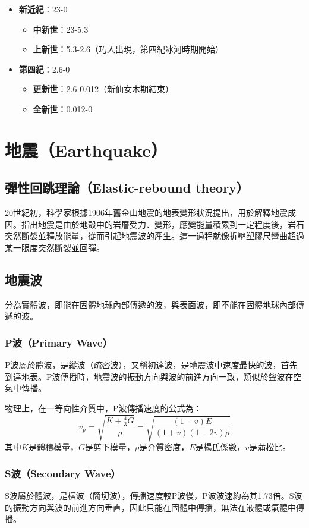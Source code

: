 \documentclass[a4paper,12pt]{report}
\begin{document}
\begin{itemize}
\begin{itemize}
\begin{itemize}
\item \textbf{新近紀}：23-0
\begin{itemize}
\item \textbf{中新世}：23-5.3
\item \textbf{上新世}：5.3-2.6（巧人出現，第四紀冰河時期開始）
\end{itemize}
\item \textbf{第四紀}：2.6-0
\begin{itemize}
\item \textbf{更新世}：2.6-0.012（新仙女木期結束）
\item \textbf{全新世}：0.012-0
\end{itemize}
\end{itemize}
\end{itemize}
\end{itemize}
\section{地震（Earthquake）}
\subsection{彈性回跳理論（Elastic-rebound theory）}
20世紀初，科學家根據1906年舊金山地震的地表變形狀況提出，用於解釋地震成因。指出地震是由於地殼中的岩層受力、變形，應變能量積累到一定程度後，岩石突然斷裂並釋放能量，從而引起地震波的產生。這一過程就像折壓塑膠尺彎曲超過某一限度突然斷裂並回彈。
\subsection{地震波}
分為實體波，即能在固體地球內部傳遞的波，與表面波，即不能在固體地球內部傳遞的波。
\subsubsection{P波（Primary Wave）}
P波屬於體波，是縱波（疏密波），又稱初達波，是地震波中速度最快的波，首先到達地表。P波傳播時，地震波的振動方向與波的前進方向一致，類似於聲波在空氣中傳播。

物理上，在一等向性介質中，P波傳播速度的公式為：
$$\displaystyle v_{p}={\sqrt {\frac {K+{\frac {4}{3}}G}{\rho }}}={\sqrt {\frac {(1-v)E}{(1+v)(1-2v)\rho }}}$$
其中$\displaystyle K$是體積模量，$\displaystyle G$是剪下模量，$\displaystyle \rho $是介質密度，$\displaystyle E$是楊氏係數，$\displaystyle v$是蒲松比。
\subsubsection{S波（Secondary Wave）}
S波屬於體波，是橫波（簡切波），傳播速度較P波慢，P波波速約為其1.73倍。S波的振動方向與波的前進方向垂直，因此只能在固體中傳播，無法在液體或氣體中傳播。
\end{document}
